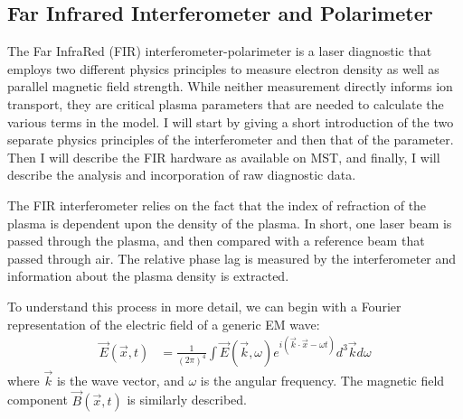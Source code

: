 \subsection{Far Infrared Interferometer and Polarimeter}
The Far InfraRed (FIR) interferometer-polarimeter is a laser diagnostic that employs two different physics principles to measure electron density as well as parallel magnetic field strength. While neither measurement directly informs ion transport, they are critical plasma parameters that are needed to calculate the various terms %
in the model. I will start by giving a short introduction of the two separate physics principles of the interferometer and then that of the parameter. Then I will describe the FIR hardware as available on MST, and finally, I will describe the analysis and incorporation of raw diagnostic data. 

The FIR interferometer relies on the fact that the index of refraction of the plasma is dependent upon the density of the plasma. In short, one laser beam is passed through the plasma, and then compared with a reference beam that passed through air. The relative phase lag is measured by the interferometer and information about the plasma density is extracted. 

To understand this process in more detail, we can begin with a Fourier representation of the electric field of a generic EM wave:
\begin{align}\label{eqn:fir_wave}
    \vec{E}(\vec{x}, t) &= \frac{1}{(2\pi)^4}\int\vec{E}(\vec{k},\omega)e^{i(\vec{k}\cdot\vec{x}-\omega t)}d^3\vec{k}d\omega 
\end{align}
where $\vec{k}$ is the wave vector, and $\omega$ is the angular frequency. The magnetic field component $\vec{B}(\vec{x},t)$ is similarly described.

